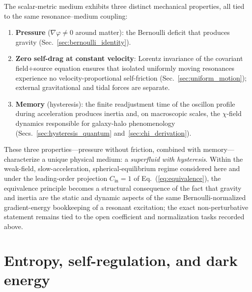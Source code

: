 \documentclass[aps,prd,onecolumn,superscriptaddress,nofootinbib,showpacs,12pt,notitlepage]{revtex4-2}
\begin{document}
The scalar-metric medium exhibits three distinct
mechanical properties, all tied to the same
resonance--medium coupling:

\begin{enumerate}
  \item \textbf{Pressure} ($\nabla\varphi \neq 0$
    around matter): the Bernoulli deficit that produces
    gravity (Sec.~\ref{sec:bernoulli_identity}).
  \item \textbf{Zero self-drag at constant velocity}:
    Lorentz invariance of the covariant field+source
    equation ensures that isolated uniformly moving
    resonances experience no velocity-proportional
    self-friction (Sec.~\ref{sec:uniform_motion});
    external gravitational and tidal forces are
    separate.
  \item \textbf{Memory} (hysteresis): the finite
    readjustment time of the oscillon profile during
    acceleration produces inertia and, on macroscopic
    scales, the $\chi$-field dynamics responsible for
    galaxy-halo phenomenology
    (Secs.~\ref{sec:hysteresis_quantum}
    and~\ref{sec:chi_derivation}).
\end{enumerate}

These three properties---pressure without friction,
combined with memory---characterize a unique physical
medium: a \emph{superfluid with hysteresis}.  Within the
weak-field, slow-acceleration, spherical-equilibrium regime
considered here and under the leading-order projection
$C_{\mathrm{in}}=1$ of Eq.~(\ref{eq:equivalence}), the
equivalence principle becomes a structural consequence of the
fact that gravity and inertia are the static and dynamic aspects
of the same Bernoulli-normalized gradient-energy bookkeeping of a
resonant excitation; the exact non-perturbative statement remains
tied to the open coefficient and normalization tasks recorded
above.

\section{Entropy, self-regulation, and dark energy}\label{sec:entropy}
\end{document}
